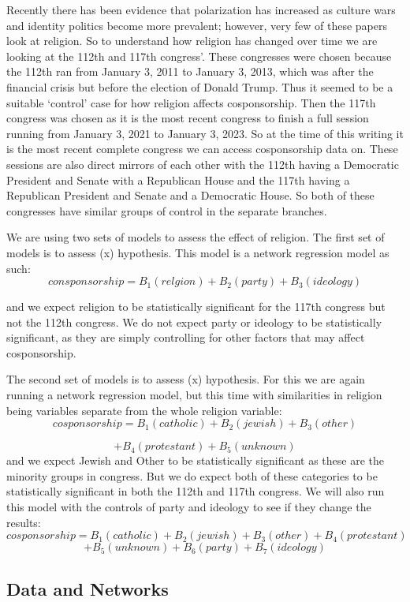 \documentclass[Royal,times,sageh]{sagej}
\begin{document}
Recently there has been evidence that polarization has increased as
culture wars and identity politics become more prevalent; however, very
few of these papers look at religion. So to understand how religion has
changed over time we are looking at the 112th and 117th congress'. These
congresses were chosen because the 112th ran from January 3, 2011 to
January 3, 2013, which was after the financial crisis but before the
election of Donald Trump. Thus it seemed to be a suitable `control' case
for how religion affects cosponsorship. Then the 117th congress was
chosen as it is the most recent congress to finish a full session
running from January 3, 2021 to January 3, 2023. So at the time of this
writing it is the most recent complete congress we can access
cosponsorship data on. These sessions are also direct mirrors of each
other with the 112th having a Democratic President and Senate with a
Republican House and the 117th having a Republican President and Senate
and a Democratic House. So both of these congresses have similar groups
of control in the separate branches.

We are using two sets of models to assess the effect of religion. The
first set of models is to assess (x) hypothesis. This model is a network
regression model as such: \[
consponsorship = B_1(relgion) + B_2(party) + B_3(ideology)
\]

and we expect religion to be statistically significant for the 117th
congress but not the 112th congress. We do not expect party or ideology
to be statistically significant, as they are simply controlling for
other factors that may affect cosponsorship.

The second set of models is to assess (x) hypothesis. For this we are
again running a network regression model, but this time with
similarities in religion being variables separate from the whole
religion variable: \[
cosponsorship = B_1(catholic) + B_2(jewish) + B_3(other) 
\]

\[
+ B_4(protestant )+ B_5(unknown)
\] and we expect Jewish and Other to be statistically significant as
these are the minority groups in congress. But we do expect both of
these categories to be statistically significant in both the 112th and
117th congress. We will also run this model with the controls of party
and ideology to see if they change the results: \[
cosponsorship = B_1(catholic) + B_2(jewish) + B_3(other) + B_4(protestant )
\] \[
+ B_5(unknown) + B_6(party) + B_7(ideology)
\]

\hypertarget{data-and-networks}{%
\subsection{Data and Networks}\label{data-and-networks}}
\end{document}
